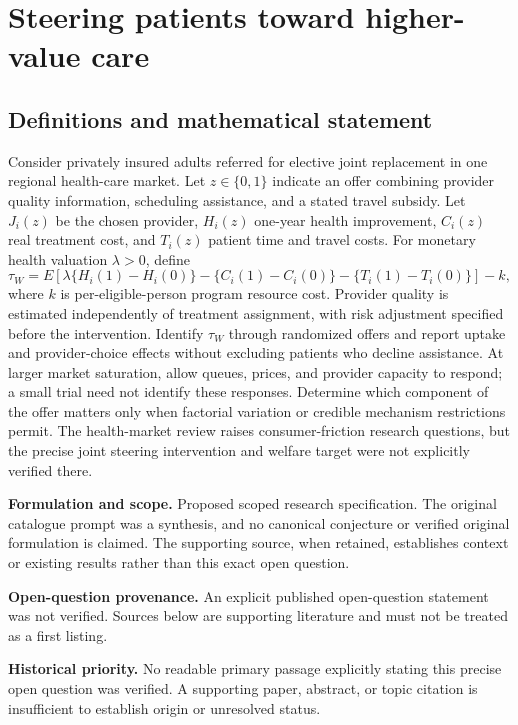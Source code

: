 \documentclass[11pt]{article}
\begin{document}
\section*{Steering patients toward higher-value care}\label{30007726}
\subsection{Definitions and mathematical statement}
Consider privately insured adults referred for elective joint replacement in one regional health-care market. Let \(z\in\{0,1\}\) indicate an offer combining provider quality information, scheduling assistance, and a stated travel subsidy. Let \(J_i(z)\) be the chosen provider, \(H_i(z)\) one-year health improvement, \(C_i(z)\) real treatment cost, and \(T_i(z)\) patient time and travel costs. For monetary health valuation \(\lambda>0\), define
\[\tau_W=E[\lambda\{H_i(1)-H_i(0)\}-\{C_i(1)-C_i(0)\}-\{T_i(1)-T_i(0)\}]-k,\]
where \(k\) is per-eligible-person program resource cost. Provider quality is estimated independently of treatment assignment, with risk adjustment specified before the intervention. Identify \(\tau_W\) through randomized offers and report uptake and provider-choice effects without excluding patients who decline assistance. At larger market saturation, allow queues, prices, and provider capacity to respond; a small trial need not identify these responses. Determine which component of the offer matters only when factorial variation or credible mechanism restrictions permit. The health-market review raises consumer-friction research questions, but the precise joint steering intervention and welfare target were not explicitly verified there.

\par\textbf{Formulation and scope.} Proposed scoped research specification. The original catalogue prompt was a synthesis, and no canonical conjecture or verified original formulation is claimed. The supporting source, when retained, establishes context or existing results rather than this exact open question.

\par\textbf{Open-question provenance.} An explicit published open-question statement was not verified. Sources below are supporting literature and must not be treated as a first listing.

\par\textbf{Historical priority.} No readable primary passage explicitly stating this precise open question was verified. A supporting paper, abstract, or topic citation is insufficient to establish origin or unresolved status.
\end{document}
